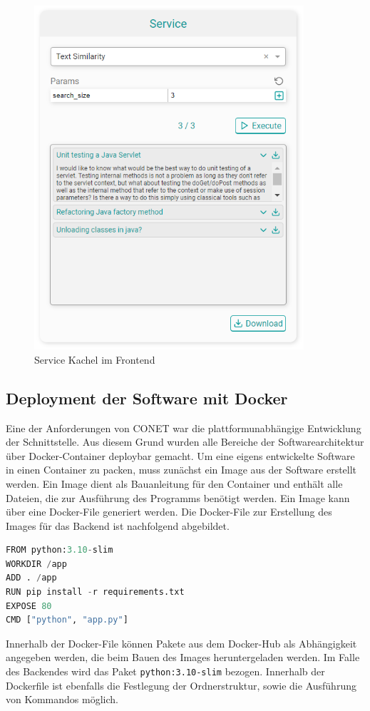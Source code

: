 \begin{figure}[H]
  \centering
    \includegraphics[width = 10cm]{bilder/websiteService}
    \caption{Service Kachel im Frontend}
\end{figure}

\subsection{Deployment der Software mit Docker}
Eine der Anforderungen von CONET war die plattformunabhängige Entwicklung der Schnittstelle. Aus diesem Grund wurden alle Bereiche der Softwarearchitektur über Docker-Container deploybar gemacht. Um eine eigens entwickelte Software in einen Container zu packen, muss zunächst ein Image aus der Software erstellt werden. Ein Image dient als Bauanleitung für den Container und enthält alle Dateien, die zur Ausführung des Programms benötigt werden. Ein Image kann über eine Docker-File generiert werden. Die Docker-File zur Erstellung des Images für das Backend ist nachfolgend abgebildet.

\begin{lstlisting}[language=Python, caption={Beispiel einer Dockefile}]
FROM python:3.10-slim
WORKDIR /app
ADD . /app
RUN pip install -r requirements.txt
EXPOSE 80
CMD ["python", "app.py"]
\end{lstlisting}

Innerhalb der Docker-File können Pakete aus dem Docker-Hub als Abhängigkeit angegeben werden, die beim Bauen des Images heruntergeladen werden. Im Falle des Backendes wird das Paket \texttt{python:3.10-slim} bezogen. Innerhalb der Dockerfile ist ebenfalls die Festlegung der Ordnerstruktur, sowie die Ausführung von Kommandos möglich.


